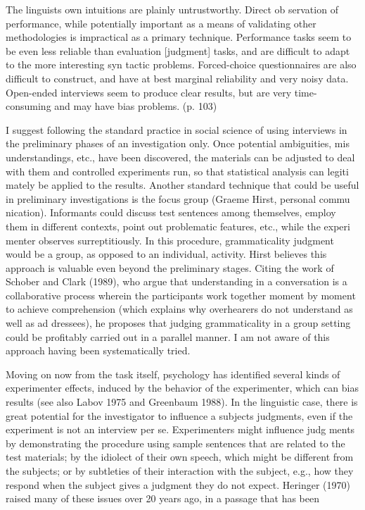 \clearpage\setcounter{page}{1}\begin{styleTextbody}
The linguist{\textquotesingle}s own intuitions are plainly untrustworthy. Direct ob\- servation of performance, while potentially important as a means of validating other methodologies is impractical as a primary technique. Performance tasks seem to be even less reliable than evaluation [judgment] tasks, and are difficult to adapt to the more interesting syn\- tactic problems. Forced-choice questionnaires are also difficult to construct, and have at best marginal reliability and very noisy data. Open-ended interviews seem to produce clear results, but are very time-consuming and may have bias problems. (p. 103)
\end{styleTextbody}


\begin{styleTextbody}
I suggest following the standard practice in social science of using interviews in the preliminary phases of an investigation only. Once potential ambiguities, mis\- understandings, etc., have been discovered, the materials can be adjusted to deal with them and controlled experiments run, so that statistical analysis can legiti\- mately be applied to the results. Another standard technique that could be useful in preliminary investigations is the focus group (Graeme Hirst, personal commu\- nication). Informants could discuss test sentences among themselves, employ them in different contexts, point out problematic features, etc., while the experi\- menter observes surreptitiously. In this procedure, grammaticality judgment would be a group, as opposed to an individual, activity. Hirst believes this approach is valuable even beyond the preliminary stages. Citing the work of Schober and Clark (1989), who argue that understanding in a conversation is a collaborative process wherein the participants work together moment by moment to achieve comprehension (which explains why overhearers do not understand as well as ad\- dressees), he proposes that judging grammaticality in a group setting could be profitably carried out in a parallel manner. I am not aware of this approach having been systematically tried.
\end{styleTextbody}


\begin{styleTextbody}
Moving on now from the task itself, psychology has identified several kinds of experimenter effects, induced by the behavior of the experimenter, which can bias results (see also Labov 1975 and Greenbaum 1988). In the linguistic case, there is great potential for the investigator to influence a subject{\textquotesingle}s judgments, even if the experiment is not an interview per se. Experimenters might influence judg\- ments by demonstrating the procedure using sample sentences that are related to the test materials; by the idiolect of their own speech, which might be different from the subject{\textquotesingle}s; or by subtleties of their interaction with the subject, e.g., how they respond when the subject gives a judgment they do not expect. Heringer (1970) raised many of these issues over 20 years ago, in a passage that has been
\end{styleTextbody}


